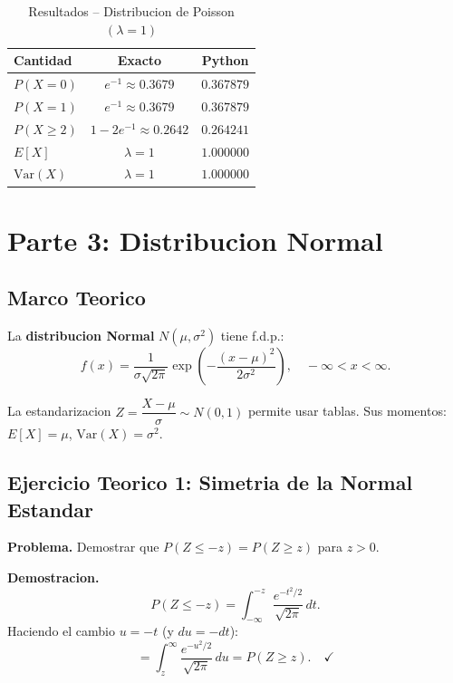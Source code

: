 \documentclass[12pt,a4paper]{article}
\begin{document}
\begin{table}[H]
\centering
\caption{Resultados -- Distribucion de Poisson $(\lambda = 1)$}
\renewcommand{\arraystretch}{1.4}
\begin{tabular}{lcc}
\toprule
\textbf{Cantidad} & \textbf{Exacto} & \textbf{Python} \\
\midrule
$P(X = 0)$    & $e^{-1} \approx 0.3679$   & $0.367879$ \\
$P(X = 1)$    & $e^{-1} \approx 0.3679$   & $0.367879$ \\
$P(X \geq 2)$ & $1-2e^{-1}\approx 0.2642$ & $0.264241$ \\
$E[X]$        & $\lambda = 1$              & $1.000000$ \\
$\mathrm{Var}(X)$ & $\lambda = 1$          & $1.000000$ \\
\bottomrule
\end{tabular}
\end{table}

\section{Parte 3: Distribucion Normal}

\subsection{Marco Teorico}

La \textbf{distribucion Normal} $N(\mu, \sigma^2)$ tiene f.d.p.:
\[
  \boxed{f(x) = \frac{1}{\sigma\sqrt{2\pi}}\exp\!\left(-\frac{(x-\mu)^2}{2\sigma^2}\right),
  \quad -\infty < x < \infty.}
\]

La estandarizacion $Z = \dfrac{X - \mu}{\sigma}\sim N(0,1)$ permite usar tablas.
Sus momentos: $E[X] = \mu$, $\mathrm{Var}(X) = \sigma^2$.

\subsection{Ejercicio Teorico 1: Simetria de la Normal Estandar}

\textbf{Problema.} Demostrar que $P(Z \leq -z) = P(Z \geq z)$ para $z > 0$.

\textbf{Demostracion.}
\[
  P(Z \leq -z) = \int_{-\infty}^{-z}\frac{e^{-t^2/2}}{\sqrt{2\pi}}\,dt.
\]
Haciendo el cambio $u = -t$ (y $du = -dt$):
\[
  = \int_{z}^{\infty}\frac{e^{-u^2/2}}{\sqrt{2\pi}}\,du = P(Z \geq z).\quad\checkmark
\]
\end{document}
